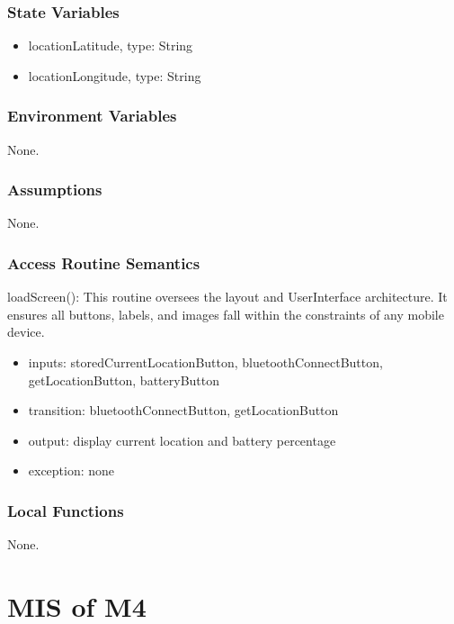 \documentclass[12pt, titlepage]{article}
\begin{document}
\subsubsection{State Variables}

\begin{itemize}
\item locationLatitude, type: String
\item locationLongitude, type: String
\end{itemize}


\subsubsection{Environment Variables}

None.


\subsubsection{Assumptions}

None.

\subsubsection{Access Routine Semantics}

\noindent loadScreen():
This routine oversees the layout and UserInterface architecture. It ensures all buttons, labels, and images fall within the constraints of any mobile device. 
\begin{itemize}
\item inputs: storedCurrentLocationButton, bluetoothConnectButton, getLocationButton, batteryButton
\item transition: bluetoothConnectButton, getLocationButton
\item output: display current location and battery percentage
\item exception: none
\end{itemize}

\subsubsection{Local Functions}

None.





\section{MIS of M4} \label{EngageStatus} 
\end{document}
